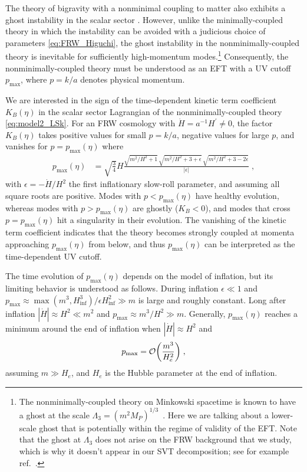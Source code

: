 \documentclass[11pt,a4paper]{article}
\newcommand{\ba}[1]{\begin{align} #1 \end{align}}
\newcommand{\Mpl}{M_P}
\newcommand{\rref}[1]{ref.~\cite{#1}}
\begin{document}
The theory of bigravity with a nonminimal coupling to matter also exhibits a ghost instability in the scalar sector \cite{Gumrukcuoglu:2015nua}. However, unlike the minimally-coupled theory in which the instability can be avoided with a judicious choice of parameters \eqref{eq:FRW_Higuchi}, the ghost instability in the nonminimally-coupled theory is inevitable for sufficiently high-momentum modes.\footnote{The nonminimally-coupled theory on Minkowski spacetime is known to have a ghost at the scale $\Lambda_3 = (m^2 \Mpl)^{1/3}$~\cite{deRham:2014naa}.  Here we are talking about a lower-scale ghost that is potentially within the regime of validity of the EFT.  Note that the ghost at $\Lambda_3$ does not arise on the FRW background that we study, which is why it doesn't appear in our SVT decomposition; see for example \rref{Schmidt-May:2014xla}.  }  Consequently, the nonminimally-coupled theory must be understood as an EFT with a UV cutoff $p_\mathrm{max}$, where $p=k/a$ denotes physical momentum.

We are interested in the sign of the time-dependent kinetic term coefficient $K_B(\eta)$ in the scalar sector Lagrangian of the nonminimally-coupled theory \eqref{eq:model2_LSk}.  For an FRW cosmology with $\dot{H} = a^{-1} H^\prime \neq 0$, the factor $K_B(\eta)$ takes positive values for small $p=k/a$, negative values for large $p$, and vanishes for $p = p_\mathrm{max}(\eta)$ where 
\ba{
    p_\mathrm{max}(\eta) 
    & = \sqrt{\frac{3}{4}} H \frac{\sqrt{m^2/H^2 + 1}\, \sqrt{m^2/H^2 + 3  + \epsilon} \, \sqrt{m^2/H^2 + 3  - 2 \epsilon}}{|\epsilon|} 
    \;,
}
with $\epsilon = -\dot{H} / H^2$ the first inflationary slow-roll parameter, and 
assuming all square roots are positive. Modes with $p < p_\mathrm{max}(\eta)$ have healthy evolution, whereas modes with $p > p_\mathrm{max}(\eta)$ are ghostly ($K_B < 0$), and modes that cross $p = p_\mathrm{max}(\eta)$ hit a singularity in their evolution.  The vanishing of the kinetic term coefficient indicates that the theory becomes strongly coupled at momenta approaching $p_\mathrm{max}(\eta)$ from below, and thus $p_\mathrm{max}(\eta)$ can be interpreted as the time-dependent UV cutoff.  

The time evolution of $p_\mathrm{max}(\eta)$ depends on the model of inflation, but its limiting behavior is understood as follows. During inflation $\epsilon  \ll 1$ and $p_\mathrm{max} \approx \max(m^3,H_\mathrm{inf}^3) / \epsilon H_\mathrm{inf}^2 \gg m$ is large and roughly constant.  Long after inflation $|\dot{H}| \approx H^2 \ll m^2$ and $p_\mathrm{max} \approx m^3 / H^2 \gg m$.  Generally, $p_\mathrm{max}(\eta)$ reaches a minimum around the end of inflation when $|\dot{H}| \approx H^2$ and 
\ba{
\label{eq:p_max_end_of_inflation}
    p_\mathrm{max} = \order{\frac{m^3}{H_e^2}}
    \;,
}
assuming $m \gg H_e$, and $H_e$ is the Hubble parameter at the end of inflation.  
\end{document}
